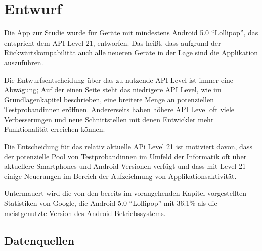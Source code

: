 
\chapter{Entwurf}
\label{ch:Entwurf}
Die App zur Studie wurde für Geräte mit mindestens Android 5.0 "`Lollipop"', das entspricht dem API Level 21, entworfen.
Das heißt, dass aufgrund der Rückwärtskompabilität auch alle neueren Geräte in der Lage sind die Applikation auszuführen.
\par


Die Entwurfsentscheidung über das zu nutzende API Level ist immer eine Abwägung;
Auf der einen Seite steht das niedrigere API Level, wie im Grundlagenkapitel beschrieben, 
eine breitere Menge an potenziellen Testprobandinnen eröffnen.
Andererseits haben höhere API Level oft viele Verbesserungen und neue Schnittstellen mit denen Entwickler mehr Funktionalität erreichen können.
\par
Die Entscheidung für das relativ aktuelle APi Level 21 ist motiviert davon, 
dass der potenzielle Pool von Testprobandinnen im Umfeld der Informatik oft über aktuellere Smartphones und Android Versionen verfügt
und dass mit Level 21 einige Neuerungen im Bereich der Aufzeichnung von Applikationsaktivität.

Untermauert wird die von den bereits im vorangehenden Kapitel vorgestellten Statistiken von Google\cite{androiddistr}, 
die Android 5.0 "`Lollipop"' mit 36.1\% als die meistgenutzte Version des Android Betriebssystems.


\section{Datenquellen}

